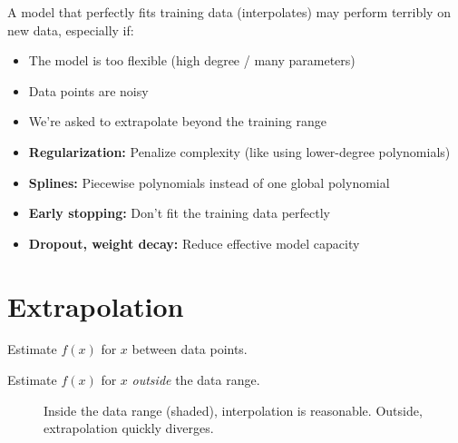  A model that perfectly fits training data (interpolates) may perform terribly on new data, especially if:
\begin{itemize}
    \item The model is too flexible (high degree / many parameters)
    \item Data points are noisy
    \item We're asked to extrapolate beyond the training range
\end{itemize}

\begin{itemize}
    \item \textbf{Regularization:} Penalize complexity (like using lower-degree polynomials)
    \item \textbf{Splines:} Piecewise polynomials instead of one global polynomial
    \item \textbf{Early stopping:} Don't fit the training data perfectly
    \item \textbf{Dropout, weight decay:} Reduce effective model capacity
\end{itemize}




\newpage
\section{Extrapolation}

 Estimate $f(x)$ for $x$ between data points.

 Estimate $f(x)$ for $x$ \emph{outside} the data range.

\begin{figure}[h]
    \centering
    \caption{Inside the data range (shaded), interpolation is reasonable. Outside, extrapolation quickly diverges.}
    \label{fig:extrapolation}
\end{figure}

